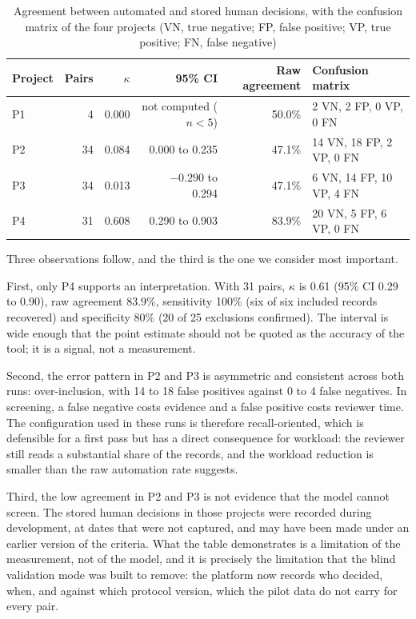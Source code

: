 \begin{table}[htbp]
\centering
\caption{Agreement between automated and stored human decisions, with the
confusion matrix of the four projects (VN, true negative; FP, false positive;
VP, true positive; FN, false negative)}
\label{tab:kappa}
\small
\begin{tabular}{@{}lrrrrl@{}}
\toprule
Project & Pairs & $\kappa$ & 95\% CI & Raw agreement & Confusion matrix \\
\midrule
P1 & 4 & 0.000 & not computed ($n<5$) & 50.0\% & 2 VN, 2 FP, 0 VP, 0 FN \\
P2 & 34 & 0.084 & 0.000 to 0.235 & 47.1\% & 14 VN, 18 FP, 2 VP, 0 FN \\
P3 & 34 & 0.013 & $-0.290$ to 0.294 & 47.1\% & 6 VN, 14 FP, 10 VP, 4 FN \\
P4 & 31 & 0.608 & 0.290 to 0.903 & 83.9\% & 20 VN, 5 FP, 6 VP, 0 FN \\
\bottomrule
\end{tabular}
\end{table}

Three observations follow, and the third is the one we consider most important.

First, only P4 supports an interpretation. With 31 pairs, $\kappa$ is 0.61
(95\% CI 0.29 to 0.90), raw agreement 83.9\%, sensitivity 100\% (six of six
included records recovered) and specificity 80\% (20 of 25 exclusions
confirmed). The interval is wide enough that the point estimate should not be
quoted as the accuracy of the tool; it is a signal, not a measurement.

Second, the error pattern in P2 and P3 is asymmetric and consistent across both
runs: over-inclusion, with 14 to 18 false positives against 0 to 4 false
negatives. In screening, a false negative costs evidence and a false positive
costs reviewer time. The configuration used in these runs is therefore
recall-oriented, which is defensible for a first pass but has a direct
consequence for workload: the reviewer still reads a substantial share of the
records, and the workload reduction is smaller than the raw automation rate
suggests.

Third, the low agreement in P2 and P3 is not evidence that the model cannot
screen. The stored human decisions in those projects were recorded during
development, at dates that were not captured, and may have been made under an
earlier version of the criteria. What the table demonstrates is a limitation of
the measurement, not of the model, and it is precisely the limitation that the
blind validation mode was built to remove: the platform now records who
decided, when, and against which protocol version, which the pilot data do not
carry for every pair.

